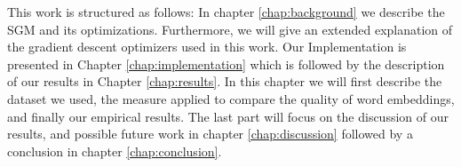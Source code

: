 This work is structured as follows: In chapter \ref{chap:background} we describe the SGM and its optimizations. Furthermore, we will give an extended explanation of the gradient descent optimizers used in this work. Our Implementation is presented in Chapter \ref{chap:implementation} which is followed by the description of our results in Chapter \ref{chap:results}. In this chapter we will first describe the dataset we used, the measure applied to compare the quality of word embeddings, and finally our empirical results. The last part will focus on the discussion of our results, and possible future work in chapter \ref{chap:discussion} followed by a conclusion in chapter \ref{chap:conclusion}.














